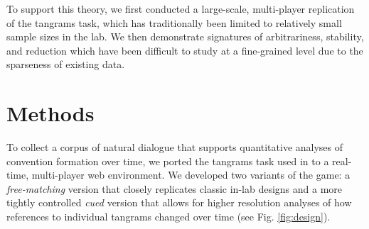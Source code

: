 \documentclass[alpha-refs]{wiley-article}
\begin{document}
To support this theory, we first conducted a large-scale, multi-player
replication of the tangrams task, which has traditionally been limited
to relatively small sample sizes in the lab. We then demonstrate signatures
of arbitrariness, stability, and reduction which have been difficult to
study at a fine-grained level due to the sparseness of existing data.

\section{Methods}

To collect a corpus of natural dialogue that supports quantitative analyses of convention formation over time, we ported the tangrams task used in \cite{ClarkWilkesGibbs86_ReferringCollaborative} to a real-time, multi-player web environment. 
We developed two variants of the game: a \emph{free-matching} version that closely replicates classic in-lab designs and a more tightly controlled \emph{cued} version that allows for higher resolution analyses of how references to individual tangrams changed over time (see Fig. \ref{fig:design}). 
\end{document}
